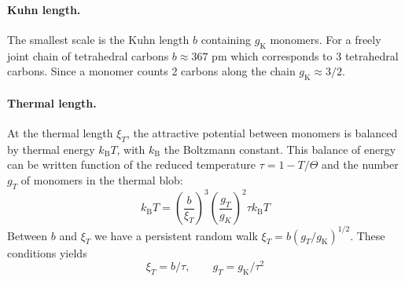 \documentclass[twoside,twocolumn,9pt]{article}
\begin{document}
\paragraph{Kuhn length.}
The smallest scale is the Kuhn length $b$ containing $g_\mathrm{K}$ monomers. For a freely joint chain of tetrahedral carbons $b\approx 367$ pm which corresponds to 3 tetrahedral carbons. Since a monomer counts 2 carbons along the chain $g_\mathrm{K}\approx 3/2$.

\paragraph{Thermal length.}
At the thermal length $\xi_T$, the attractive potential between monomers is balanced by thermal energy $k_\mathrm{B}T$, with $k_\mathrm{B}$ the Boltzmann constant. This balance of energy can be written function of the reduced temperature $\tau = 1 -T/\Theta$ and the number $g_T$ of monomers in the thermal blob:
\begin{equation}
k_\mathrm{B}T = \left(\frac{b}{\xi_T}\right)^3\left(\frac{g_T}{g_K}\right)^2 \tau k_\mathrm{B}T 
\label{eq:poorkT}
\end{equation}
Between $b$ and $\xi_T$ we have a persistent random walk $\xi_T = b (g_T/g_\mathrm{K})^{1/2}$. These conditions yields 
\begin{equation}
\xi_T = b/\tau,\qquad g_T = g_\mathrm{K}/\tau^2
\label{eq:thermal}
\end{equation}
\end{document}
